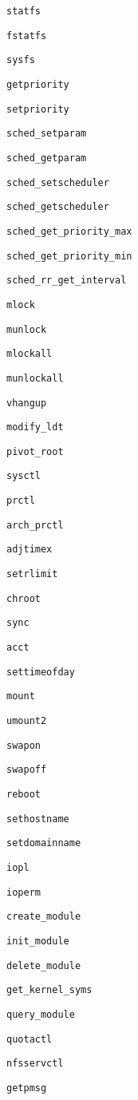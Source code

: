 \verb+statfs+

\verb+fstatfs+

\verb+sysfs+

\verb+getpriority+

\verb+setpriority+

\verb+sched_setparam+

\verb+sched_getparam+

\verb+sched_setscheduler+

\verb+sched_getscheduler+

\verb+sched_get_priority_max+

\verb+sched_get_priority_min+

\verb+sched_rr_get_interval+

\verb+mlock+

\verb+munlock+

\verb+mlockall+

\verb+munlockall+

\verb+vhangup+

\verb+modify_ldt+

\verb+pivot_root+

\verb+sysctl+

\verb+prctl+

\verb+arch_prctl+

\verb+adjtimex+

\verb+setrlimit+

\verb+chroot+

\verb+sync+

\verb+acct+

\verb+settimeofday+

\verb+mount+

\verb+umount2+

\verb+swapon+

\verb+swapoff+

\verb+reboot+

\verb+sethostname+

\verb+setdomainname+

\verb+iopl+

\verb+ioperm+

\verb+create_module+

\verb+init_module+

\verb+delete_module+

\verb+get_kernel_syms+

\verb+query_module+

\verb+quotactl+

\verb+nfsservctl+

\verb+getpmsg+

